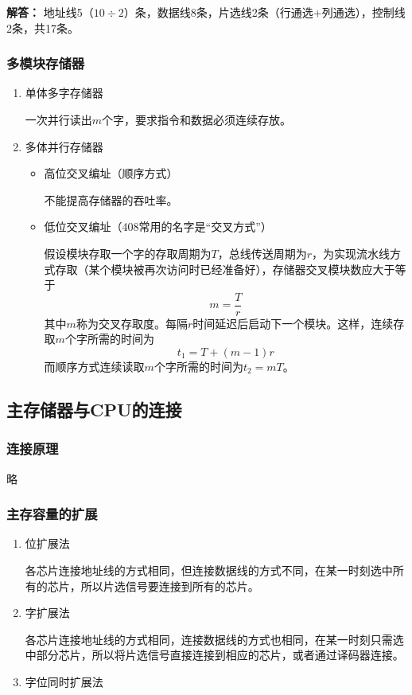 \documentclass[12pt, a4paper, oneside]{ctexart}
\newenvironment{solution}{\begin{shaded}\par\noindent\textbf{解答：}}{\end{shaded}\par}
\begin{document}
\begin{solution}
  地址线5（$10\div 2$）条，数据线8条，片选线2条（行通选+列通选），控制线2条，共17条。
\end{solution}

\subsubsection{多模块存储器}

\begin{enumerate}
  \item {\kaishu 单体多字存储器}
  
  一次并行读出$m$个字，要求指令和数据必须连续存放。
  \item {\kaishu 多体并行存储器}
  \begin{itemize}
    \item 高位交叉编址（顺序方式）
    
    不能提高存储器的吞吐率。
    \item 低位交叉编址（408常用的名字是“交叉方式”）
    
    假设模块存取一个字的存取周期为$T$，总线传送周期为$r$，为实现流水线方式存取（某个模块被再次访问时已经准备好），存储器交叉模块数应大于等于
    \begin{equation*}
      m=\frac{T}{r}
    \end{equation*}
    其中$m$称为交叉存取度。每隔$r$时间延迟后启动下一个模块。这样，连续存取$m$个字所需的时间为
    \begin{equation*}
      t_1=T+(m-1)r
    \end{equation*}
    而顺序方式连续读取$m$个字所需的时间为$t_2=mT$。
  \end{itemize}
\end{enumerate}

\subsection{主存储器与CPU的连接}

\subsubsection{连接原理}

略

\subsubsection{主存容量的扩展}

\begin{enumerate}
  \item {\kaishu 位扩展法}
  
  各芯片连接地址线的方式相同，但连接数据线的方式不同，在某一时刻选中所有的芯片，所以片选信号要连接到所有的芯片。
  \item {\kaishu 字扩展法}
  
  各芯片连接地址线的方式相同，连接数据线的方式也相同，在某一时刻只需选中部分芯片，所以将片选信号直接连接到相应的芯片，或者通过译码器连接。
  \item {\kaishu 字位同时扩展法}
\end{enumerate}
\end{document}
